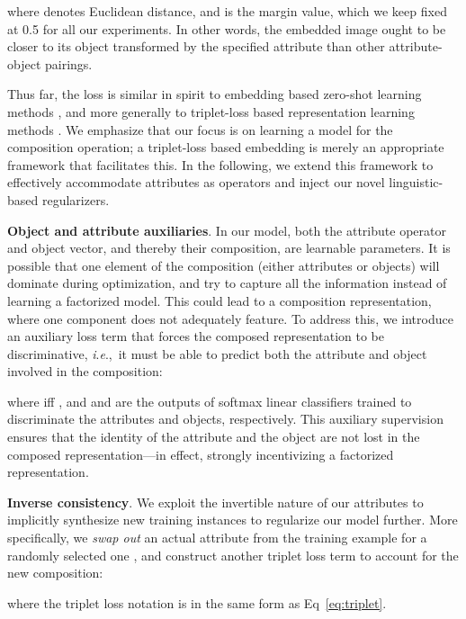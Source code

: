 \documentclass[runningheads]{llncs}
\newcommand{\ie}{\textit{i}.\textit{e}.,~}
\begin{document}
where  denotes Euclidean distance, and  is the margin value, which we keep fixed at 0.5 for all our experiments. In other words, the embedded image ought to be closer to its object transformed by the specified attribute  than other attribute-object pairings.

Thus far, the loss is similar in spirit to embedding based zero-shot learning methods \cite{xian2017zero}, and more generally to triplet-loss based representation learning methods \cite{cheng2016person,hoffer2015deep,schroff2015facenet}. We emphasize that our focus is on learning a model for the composition operation; a triplet-loss based embedding is merely an appropriate framework that facilitates this. In the following, we extend this framework to effectively accommodate attributes as operators and inject our novel linguistic-based regularizers.

\vspace{0.05in}
\noindent\textbf{Object and attribute auxiliaries}.
In our model, both the attribute operator and object vector, and thereby their composition, are learnable parameters. It is possible that one element of the composition (either attributes or objects) will dominate during optimization, and try to capture all the information instead of learning a factorized model. This could lead to a composition representation, where one component does not adequately feature. To address this, we introduce an auxiliary loss term that forces the composed representation to be discriminative, \ie it must be able to predict both the attribute and object involved in the composition:

where  iff , and  and  are the outputs of softmax linear classifiers trained to discriminate the attributes and objects, respectively. 
This auxiliary supervision ensures that the identity of the attribute and the object are not lost in the composed representation---in effect, strongly incentivizing a factorized representation.

\vspace{0.05in}
\noindent\textbf{Inverse consistency}.
We exploit the invertible nature of our attributes to implicitly synthesize new training instances to regularize our model further. More specifically, we \emph{swap out} an actual attribute  from the training example for a randomly selected one , and construct another triplet loss term to account for the new composition:

where the triplet loss notation is in the same form as Eq~\ref{eq:triplet}.
\end{document}
